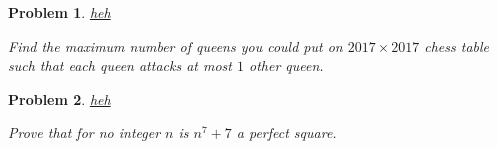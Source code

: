 \documentclass[12pt]{article}
\newtheorem{problem}{Problem}
\begin{document}
	
	
	\bigskip
	
	
	
	\begin{problem}
		\href{https://artofproblemsolving.com/community/c6h1417932p7979120}{heh}
		
		Find the maximum number of queens you could put on $2017 \times 2017$ chess table such that each queen attacks at most $1$ other queen.
	\end{problem}
	\bigskip
	
	
	\begin{problem}
		\href{https://artofproblemsolving.com/community/q1h1788095p11814194}{heh}
		
		Prove that for no integer $ n$ is $ n^7 + 7$ a perfect square.
	\end{problem}
	
	
	
	
\end{document}
